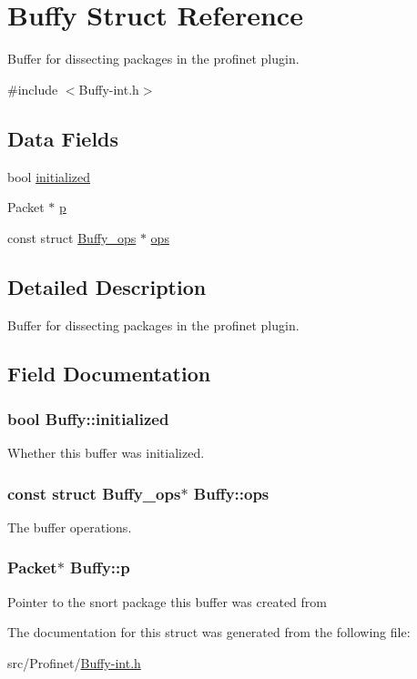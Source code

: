 \hypertarget{struct_buffy}{\section{Buffy Struct Reference}
\label{struct_buffy}
}


Buffer for dissecting packages in the profinet plugin.  




{\ttfamily \#include $<$Buffy-\/int.\-h$>$}

\subsection*{Data Fields}
\begin{DoxyCompactItemize}
\item 
bool \hyperlink{struct_buffy_a7c348a4760832590feb6029e9887a266}{initialized}
\item 
Packet $\ast$ \hyperlink{struct_buffy_a31f5f80e4d23a823a8a7e9e26341600b}{p}
\item 
const struct \hyperlink{struct_buffy__ops}{Buffy\-\_\-ops} $\ast$ \hyperlink{struct_buffy_a104accd70cf0c88ec61f2577930e73f8}{ops}
\end{DoxyCompactItemize}


\subsection{Detailed Description}
Buffer for dissecting packages in the profinet plugin. 

\subsection{Field Documentation}
\hypertarget{struct_buffy_a7c348a4760832590feb6029e9887a266}{
\subsubsection[{initialized}]{\setlength{\rightskip}{0pt plus 5cm}bool Buffy\-::initialized}}\label{struct_buffy_a7c348a4760832590feb6029e9887a266}
Whether this buffer was initialized. \hypertarget{struct_buffy_a104accd70cf0c88ec61f2577930e73f8}{
\subsubsection[{ops}]{\setlength{\rightskip}{0pt plus 5cm}const struct {\bf Buffy\-\_\-ops}$\ast$ Buffy\-::ops}}\label{struct_buffy_a104accd70cf0c88ec61f2577930e73f8}
The buffer operations. \hypertarget{struct_buffy_a31f5f80e4d23a823a8a7e9e26341600b}{
\subsubsection[{p}]{\setlength{\rightskip}{0pt plus 5cm}Packet$\ast$ Buffy\-::p}}\label{struct_buffy_a31f5f80e4d23a823a8a7e9e26341600b}
Pointer to the snort package this buffer was created from 

The documentation for this struct was generated from the following file\-:\begin{DoxyCompactItemize}
\item 
src/\-Profinet/\hyperlink{_buffy-int_8h}{Buffy-\/int.\-h}\end{DoxyCompactItemize}
